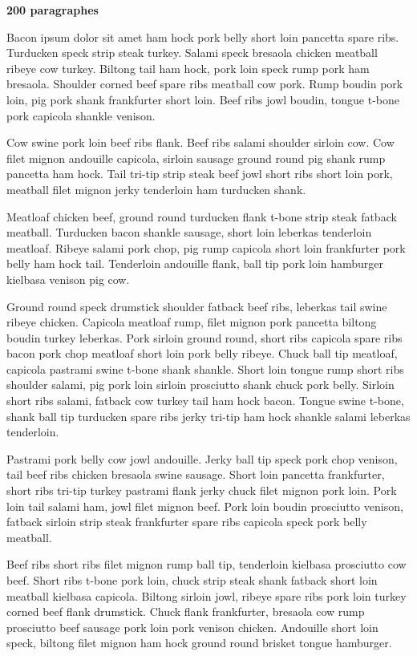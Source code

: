\centerline{\bf 200 paragraphes}


Bacon ipsum dolor sit amet ham hock pork belly short loin pancetta spare ribs. Turducken speck strip steak turkey. Salami speck bresaola chicken meatball ribeye cow turkey. Biltong tail ham hock, pork loin speck rump pork ham bresaola. Shoulder corned beef spare ribs meatball cow pork. Rump boudin pork loin, pig pork shank frankfurter short loin. Beef ribs jowl boudin, tongue t-bone pork capicola shankle venison.

Cow swine pork loin beef ribs flank. Beef ribs salami shoulder sirloin cow. Cow filet mignon andouille capicola, sirloin sausage ground round pig shank rump pancetta ham hock. Tail tri-tip strip steak beef jowl short ribs short loin pork, meatball filet mignon jerky tenderloin ham turducken shank.

Meatloaf chicken beef, ground round turducken flank t-bone strip steak fatback meatball. Turducken bacon shankle sausage, short loin leberkas tenderloin meatloaf. Ribeye salami pork chop, pig rump capicola short loin frankfurter pork belly ham hock tail. Tenderloin andouille flank, ball tip pork loin hamburger kielbasa venison pig cow.

Ground round speck drumstick shoulder fatback beef ribs, leberkas tail swine ribeye chicken. Capicola meatloaf rump, filet mignon pork pancetta biltong boudin turkey leberkas. Pork sirloin ground round, short ribs capicola spare ribs bacon pork chop meatloaf short loin pork belly ribeye. Chuck ball tip meatloaf, capicola pastrami swine t-bone shank shankle. Short loin tongue rump short ribs shoulder salami, pig pork loin sirloin prosciutto shank chuck pork belly. Sirloin short ribs salami, fatback cow turkey tail ham hock bacon. Tongue swine t-bone, shank ball tip turducken spare ribs jerky tri-tip ham hock shankle salami leberkas tenderloin.

Pastrami pork belly cow jowl andouille. Jerky ball tip speck pork chop venison, tail beef ribs chicken bresaola swine sausage. Short loin pancetta frankfurter, short ribs tri-tip turkey pastrami flank jerky chuck filet mignon pork loin. Pork loin tail salami ham, jowl filet mignon beef. Pork loin boudin prosciutto venison, fatback sirloin strip steak frankfurter spare ribs capicola speck pork belly meatball.

Beef ribs short ribs filet mignon rump ball tip, tenderloin kielbasa prosciutto cow beef. Short ribs t-bone pork loin, chuck strip steak shank fatback short loin meatball kielbasa capicola. Biltong sirloin jowl, ribeye spare ribs pork loin turkey corned beef flank drumstick. Chuck flank frankfurter, bresaola cow rump prosciutto beef sausage pork loin pork venison chicken. Andouille short loin speck, biltong filet mignon ham hock ground round brisket tongue hamburger.

